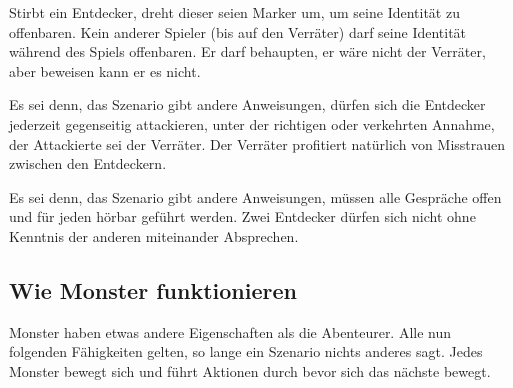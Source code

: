 Stirbt ein Entdecker, dreht dieser seien Marker um, um seine Identität zu offenbaren. Kein anderer Spieler (bis auf den Verräter) darf seine Identität während des Spiels offenbaren. Er darf behaupten, er wäre nicht der Verräter, aber beweisen kann er es nicht.

Es sei denn, das Szenario gibt andere Anweisungen, dürfen sich die Entdecker jederzeit gegenseitig attackieren, unter der richtigen oder verkehrten Annahme, der Attackierte sei der Verräter. Der Verräter profitiert natürlich von Misstrauen zwischen den Entdeckern.

Es sei denn, das Szenario gibt andere Anweisungen, müssen alle Gespräche offen und für jeden hörbar geführt werden. Zwei Entdecker dürfen sich nicht ohne Kenntnis der anderen miteinander Absprechen.

\subsection{Wie Monster funktionieren}
\label{kap:rules:monsters}

Monster haben etwas andere Eigenschaften als die Abenteurer. Alle nun folgenden Fähigkeiten gelten, so lange ein Szenario nichts anderes sagt. Jedes Monster bewegt sich und führt Aktionen durch bevor sich das nächste bewegt.

